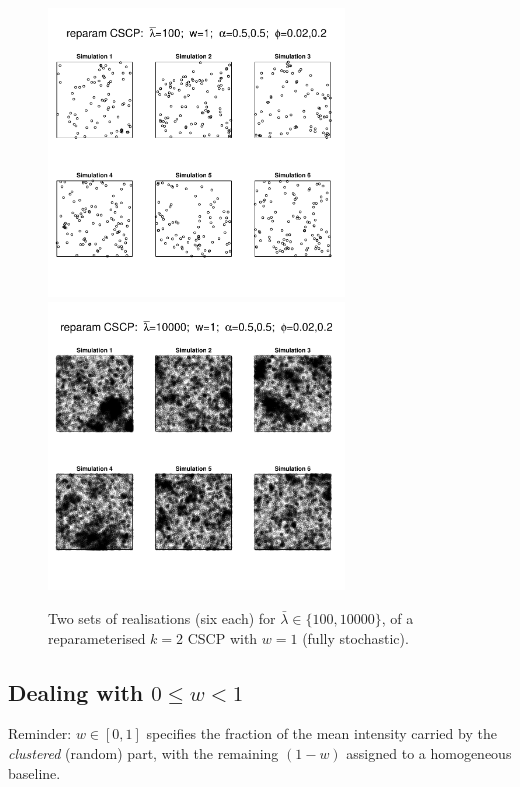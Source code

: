 \documentclass[11pt]{article}
\begin{document}
\begin{figure}
	\includegraphics[width=0.7\textwidth]{fig_repam_w1_100.pdf}\\
	\includegraphics[width=0.7\textwidth]{fig_repam_w1_10000.pdf}\\
	\caption{Two sets of realisations (six each) for $\bar{\lambda}\in\{100,10000\}$, of a reparameterised $k=2$ CSCP with $w=1$ (fully stochastic).}\label{fig:repam}
\end{figure}


\subsection{Dealing with $0\leq w<1$}

Reminder: $w\in[0,1]$ specifies the fraction of the
mean intensity carried by the \emph{clustered} (random) part, with the remaining
$(1-w)$ assigned to a homogeneous baseline.
\end{document}

